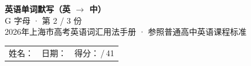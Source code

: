 \documentclass[10pt,a4paper]{article}
\begin{document}
\pagestyle{plain}

\begin{center}
{\LARGE\bfseries 英语单词默写（英 $\to$ 中）}\\[0.22em]
{\large G 字母 · 第 2 / 3 份}\\[0.18em]
{\small 2026年上海市高考英语词汇用法手册 · 参照普通高中英语课程标准}
\end{center}

\vspace{0.25em}
\noindent\begin{tabular}{@{}p{}@{}p{}@{}p{}@{}}
姓名：\underline{\hspace{2.0cm}} & 日期：\underline{\hspace{2.0cm}} & 得分：\underline{\hspace{1.3cm}}\,/\,41 \\
\end{tabular}

\vspace{0.3em}

\vspace{0.08em}
\end{document}
